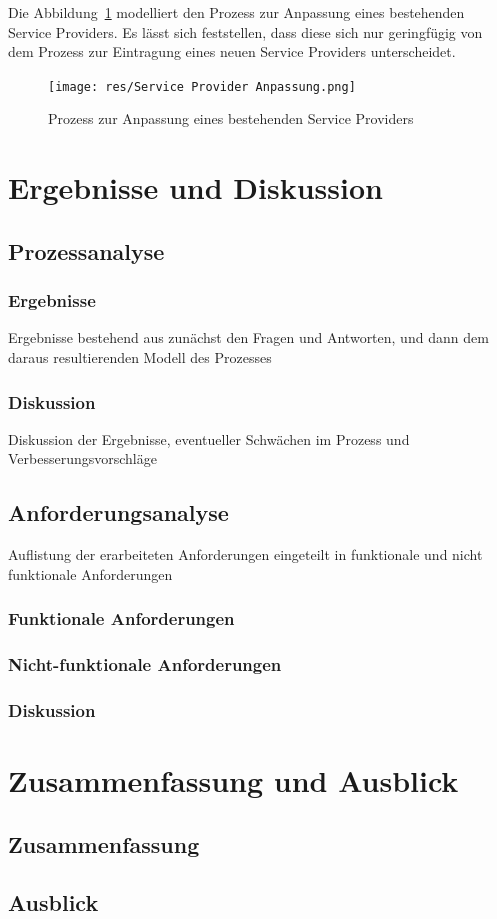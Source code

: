 \documentclass[a4paper, fontsize=11pt]{scrartcl}
\begin{document}
Die Abbildung~\ref{fig:service-provider-anpassung} modelliert den Prozess zur Anpassung eines bestehenden Service Providers. Es lässt sich feststellen, dass diese sich nur geringfügig von dem Prozess zur Eintragung eines neuen Service Providers unterscheidet.
\begin{figure}[H]
  \centering
  \texttt{[image: res/Service Provider Anpassung.png]}
  \caption{Prozess zur Anpassung eines bestehenden Service Providers}\label{fig:service-provider-anpassung}
\end{figure}

\section{Ergebnisse und Diskussion}\label{sec:results}
\subsection{Prozessanalyse}\label{subsec:prozessanalyse-results}
\subsubsection{Ergebnisse}\label{subsubsec:prozessanalyse-results}
Ergebnisse bestehend aus zunächst den Fragen und Antworten, und dann dem daraus resultierenden Modell des Prozesses
\subsubsection{Diskussion}\label{subsubsec:prozessanalyse-discussion}
Diskussion der Ergebnisse, eventueller Schwächen im Prozess und Verbesserungsvorschläge
\subsection{Anforderungsanalyse}\label{subsec:anforderungsanalyse-results}
Auflistung der erarbeiteten Anforderungen eingeteilt in funktionale und nicht funktionale Anforderungen
\subsubsection{Funktionale Anforderungen}\label{subsubsec:functional-requirements}
\subsubsection{Nicht-funktionale Anforderungen}\label{subsubsec:non-functional-requirements}
\subsubsection{Diskussion}\label{subsubsec:anforderungsanalyse-discussion}

\section{Zusammenfassung und Ausblick}\label{sec:summary}
\subsection{Zusammenfassung}\label{subsec:summary}
\subsection{Ausblick}\label{subsec:outlook}

\newpage

\printbibliography{}
\listoffigures
\end{document}
